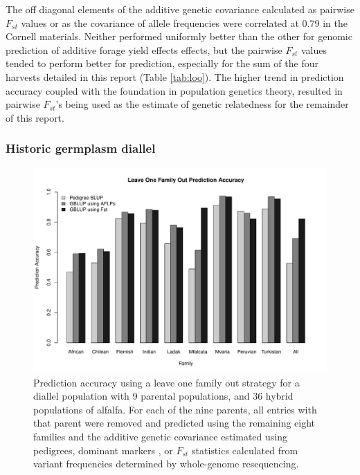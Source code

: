 \documentclass[12pt, letterpaper]{article}
\begin{document}
The off diagonal elements of the additive genetic covariance calculated as pairwise $F_{st}$ values or as the covariance of allele frequencies were correlated at 0.79 in the Cornell materials. Neither performed uniformly better than the other for genomic prediction of additive forage yield effects effects, but the pairwise $F_{st}$ values tended to perform better for prediction, especially for the sum of the four harvests detailed in this report (Table \ref{tab:loo}). The higher trend in prediction accuracy coupled with the foundation in population genetics theory, resulted in pairwise $F_{st}$'s being used as the estimate of genetic relatedness for the remainder of this report.

\subsubsection{Historic germplasm diallel}

\begin{figure}
\includegraphics[width = \linewidth]{FstLeaveOneFamOutPredAccBW}
\caption{Prediction accuracy using a leave one family out strategy for a diallel population with 9 parental populations, and 36 hybrid populations of alfalfa. For each of the nine parents, all entries with that parent were removed and predicted using the remaining eight families and the additive genetic covariance estimated using pedigrees, dominant markers \parencite[1544 AFLPs;][]{segovia2003}, or $F_{st}$ statistics calculated from variant frequencies determined by whole-genome resequencing.}
\label{diallelpredacc}
\end{figure}
\end{document}
